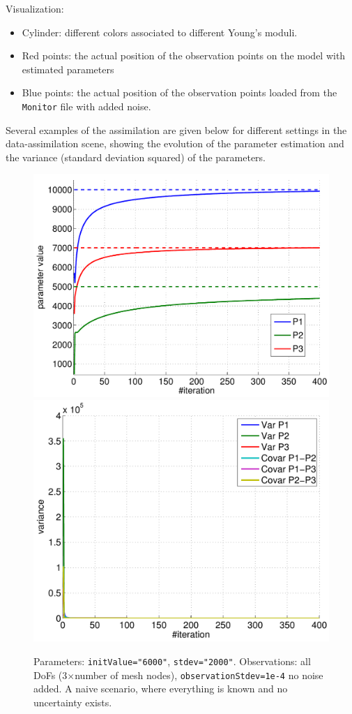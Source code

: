 \documentclass[10pt]{article}
\begin{document}
 Visualization:
 \begin{itemize}
  \item Cylinder: different colors associated to different Young's moduli. 
  \item Red points: the actual position of the observation points on the model with estimated parameters  
  \item Blue points: the actual position of the observation points loaded from the \texttt{Monitor} file with added noise.
 \end{itemize}
 

Several examples of the assimilation are given below for different settings in the data-assimilation scene, showing the evolution of the parameter
estimation and the variance (standard deviation squared) of the 
parameters.


\begin{figure}[h]
\begin{center}
\includegraphics[width=.49\linewidth]{figures/p1_estim.pdf}
\hfill
\includegraphics[width=.49\linewidth]{figures/p1_var.pdf}
\caption{Parameters: \texttt{initValue="6000"}, \texttt{stdev="2000"}. Observations: all DoFs (3$\times$number of mesh nodes),
\texttt{observationStdev=1e-4} no noise added. A naive scenario, where everything is known and no uncertainty exists.}
\label{fig:Results1}
\end{center}
\end{figure}
\end{document}
